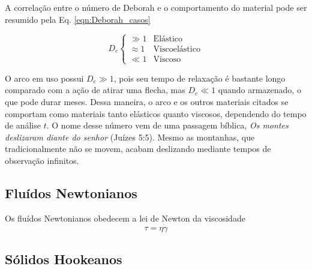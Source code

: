 		A correlação entre o número de Deborah e o comportamento do material pode ser resumido pela Eq. \ref{eqn:Deborah_casos}
		
		\begin{equation}
			D_e
			\begin{cases}
				\gg 1     & \textrm{Elástico}      \\
				\approx 1 & \textrm{Viscoelástico} \\
				\ll 1     & \textrm{Viscoso}
			\end{cases}
			\label{eqn:Deborah_casos}
		\end{equation}
		
		O arco em uso possui \(D_e\gg1\), pois seu tempo de relaxação é bastante longo comparado com a ação de atirar uma flecha, mas \(D_e\ll1\) quando armazenado, o que pode durar meses. Dessa maneira, o arco e os outros materiais citados se comportam como materiais tanto elásticos quanto viscosos, dependendo do tempo de análise \(t\). O nome desse número vem de uma passagem bíblica, \emph{Os montes deslizaram diante do senhor} (Juízes 5:5). Mesmo as montanhas, que tradicionalmente não se movem, acabam deslizando mediante tempos de observação infinitos.
		
			\subsection{Fluídos Newtonianos}
			
					
			Os fluídos Newtonianos obedecem a lei de Newton da viscosidade
			\begin{equation}
				\tau = \eta\dot{\gamma}
				\label{eqn:Newton}
			\end{equation}
	
				
			\subsection{Sólidos Hookeanos}
			
			
			
